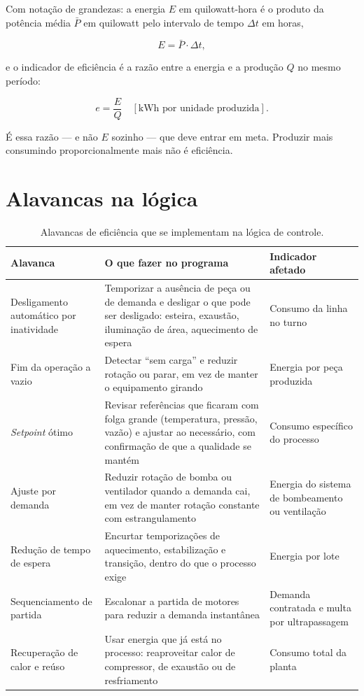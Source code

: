 Com notação de grandezas: a energia $E$ em quilowatt-hora é o produto da potência média $\bar{P}$ em
quilowatt pelo intervalo de tempo $\Delta t$ em horas,

\[
E = \bar{P} \cdot \Delta t ,
\]

e o indicador de eficiência é a razão entre a energia e a produção $Q$ no mesmo período:

\[
e = \frac{E}{Q} \quad [\text{kWh por unidade produzida}] .
\]

É essa razão --- e não $E$ sozinho --- que deve entrar em meta. Produzir mais consumindo
proporcionalmente mais não é eficiência.


\section{Alavancas na lógica}

\begin{table}[H]
  \centering
  \caption{Alavancas de eficiência que se implementam na lógica de controle.}
  \label{tab:alavancas-eficiencia}
  \begin{tabular}{p{3.7cm} p{5.6cm} p{5.0cm}}
    \toprule
    Alavanca & O que fazer no programa & Indicador afetado \\
    \midrule
    Desligamento automático por inatividade
      & Temporizar a ausência de peça ou de demanda e desligar o que pode ser desligado: esteira,
        exaustão, iluminação de área, aquecimento de espera
      & Consumo da linha no turno \\
    \addlinespace
    Fim da operação a vazio
      & Detectar ``sem carga'' e reduzir rotação ou parar, em vez de manter o equipamento girando
      & Energia por peça produzida \\
    \addlinespace
    \emph{Setpoint} ótimo
      & Revisar referências que ficaram com folga grande (temperatura, pressão, vazão) e ajustar ao
        necessário, com confirmação de que a qualidade se mantém
      & Consumo específico do processo \\
    \addlinespace
    Ajuste por demanda
      & Reduzir rotação de bomba ou ventilador quando a demanda cai, em vez de manter rotação
        constante com estrangulamento
      & Energia do sistema de bombeamento ou ventilação \\
    \addlinespace
    Redução de tempo de espera
      & Encurtar temporizações de aquecimento, estabilização e transição, dentro do que o processo
        exige
      & Energia por lote \\
    \addlinespace
    Sequenciamento de partida
      & Escalonar a partida de motores para reduzir a demanda instantânea
      & Demanda contratada e multa por ultrapassagem \\
    \addlinespace
    Recuperação de calor e reúso
      & Usar energia que já está no processo: reaproveitar calor de compressor, de exaustão ou de
        resfriamento
      & Consumo total da planta \\
    \bottomrule
  \end{tabular}
\end{table}

